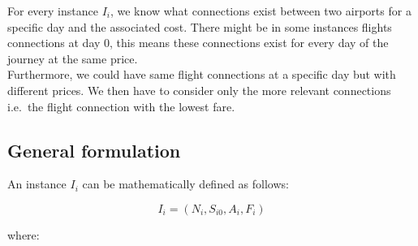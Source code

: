 For every instance $I_i$, we know what connections exist between two airports for a specific day and the associated cost.
There might be in some instances flights connections at day 0, this means these connections exist for every day of the journey at the same price.
\\Furthermore, we could have same flight connections at a specific day but with different prices. We then have to consider only the more relevant connections i.e.\ the flight connection with the lowest fare.

\subsection{General formulation}

An instance \(I_i\) can be mathematically defined as follows:

\[
    I_i = (N_i, S_{i0}, A_{i}, F_{i})
\]

where:


